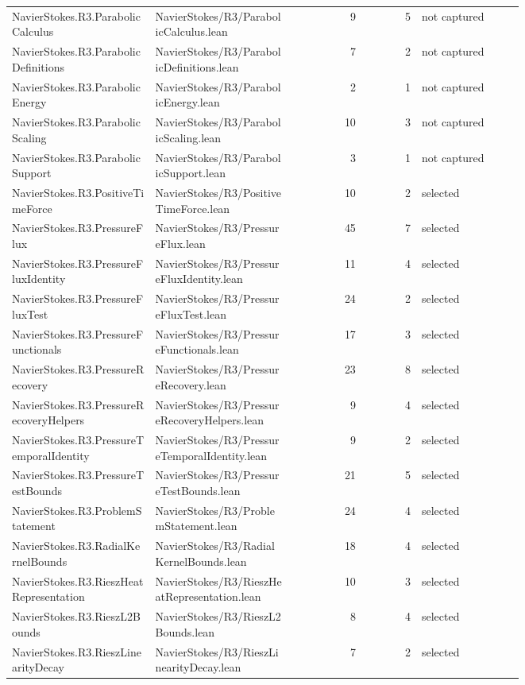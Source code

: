 \documentclass[10pt]{article}
\begin{document}
\begin{longtable}{p{0.28\linewidth}p{0.27\linewidth}r r p{0.20\linewidth}}
NavierStokes.R3.ParabolicCalculus & NavierStokes/R3/ParabolicCalculus.lean & 9 & 5 & not captured\\
NavierStokes.R3.ParabolicDefinitions & NavierStokes/R3/ParabolicDefinitions.lean & 7 & 2 & not captured\\
NavierStokes.R3.ParabolicEnergy & NavierStokes/R3/ParabolicEnergy.lean & 2 & 1 & not captured\\
NavierStokes.R3.ParabolicScaling & NavierStokes/R3/ParabolicScaling.lean & 10 & 3 & not captured\\
NavierStokes.R3.ParabolicSupport & NavierStokes/R3/ParabolicSupport.lean & 3 & 1 & not captured\\
NavierStokes.R3.PositiveTimeForce & NavierStokes/R3/PositiveTimeForce.lean & 10 & 2 & selected\\
NavierStokes.R3.PressureFlux & NavierStokes/R3/PressureFlux.lean & 45 & 7 & selected\\
NavierStokes.R3.PressureFluxIdentity & NavierStokes/R3/PressureFluxIdentity.lean & 11 & 4 & selected\\
NavierStokes.R3.PressureFluxTest & NavierStokes/R3/PressureFluxTest.lean & 24 & 2 & selected\\
NavierStokes.R3.PressureFunctionals & NavierStokes/R3/PressureFunctionals.lean & 17 & 3 & selected\\
NavierStokes.R3.PressureRecovery & NavierStokes/R3/PressureRecovery.lean & 23 & 8 & selected\\
NavierStokes.R3.PressureRecoveryHelpers & NavierStokes/R3/PressureRecoveryHelpers.lean & 9 & 4 & selected\\
NavierStokes.R3.PressureTemporalIdentity & NavierStokes/R3/PressureTemporalIdentity.lean & 9 & 2 & selected\\
NavierStokes.R3.PressureTestBounds & NavierStokes/R3/PressureTestBounds.lean & 21 & 5 & selected\\
NavierStokes.R3.ProblemStatement & NavierStokes/R3/ProblemStatement.lean & 24 & 4 & selected\\
NavierStokes.R3.RadialKernelBounds & NavierStokes/R3/RadialKernelBounds.lean & 18 & 4 & selected\\
NavierStokes.R3.RieszHeatRepresentation & NavierStokes/R3/RieszHeatRepresentation.lean & 10 & 3 & selected\\
NavierStokes.R3.RieszL2Bounds & NavierStokes/R3/RieszL2Bounds.lean & 8 & 4 & selected\\
NavierStokes.R3.RieszLinearityDecay & NavierStokes/R3/RieszLinearityDecay.lean & 7 & 2 & selected\\

\end{longtable}
\end{document}
